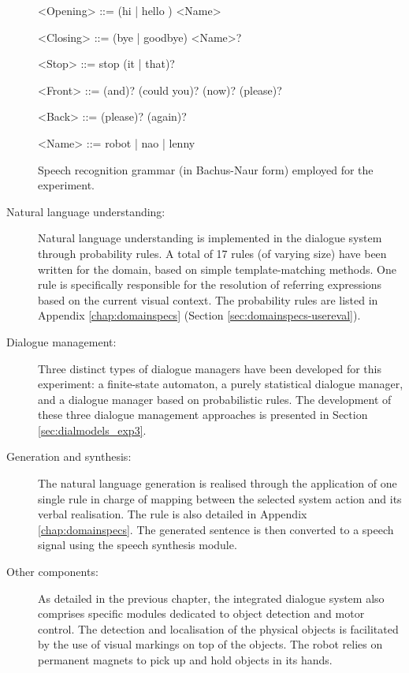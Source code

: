 \begin{description}
\begin{table}[p!]
\begin{grammar}
<Opening> ::= (hi | hello ) <Name>

<Closing> ::= (bye | goodbye) <Name>?

<Stop> ::= stop (it | that)?
 
<Front> ::= (and)? (could you)? (now)? (please)?

<Back> ::= (please)? (again)?

<Name> ::= robot | nao | lenny

\end{grammar}
\caption{Speech recognition grammar (in Bachus-Naur form) employed for the experiment.}
\label{table:asr}
\end{table}

\item[Natural language understanding: ] Natural language understanding is implemented in the dialogue system through probability rules.  A total of 17 rules (of varying size) have been written for the domain, based on simple template-matching methods. One rule is specifically responsible for the resolution of referring expressions based on the current visual context. The probability rules are listed in Appendix \ref{chap:domainspecs} (Section \ref{sec:domainspecs-usereval}). 

\item[Dialogue management: ] Three distinct types of dialogue managers have been developed for this experiment: a finite-state automaton, a purely statistical dialogue manager, and a dialogue manager based on probabilistic rules.  The development of these three dialogue management approaches is presented in Section \ref{sec:dialmodels_exp3}. 

\item[Generation and synthesis: ] The natural language generation is realised through the application of one single rule in charge of mapping between the selected system action and its verbal realisation. The rule is also detailed in Appendix \ref{chap:domainspecs}.  The generated sentence is then converted to a speech signal using the speech synthesis module.

\item [Other components: ] As detailed in the previous chapter, the integrated dialogue system also comprises specific modules dedicated to object detection and motor control.  The detection and localisation of the physical objects is facilitated by the use of visual markings on top of the objects.  The robot relies on permanent magnets to pick up and hold objects in its hands. 

\end{description}

